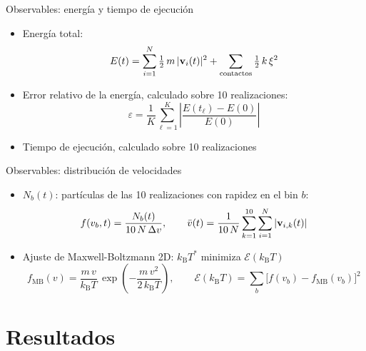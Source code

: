 \documentclass[aspectratio=169]{beamer}
\newcommand{\kT}{k_{\mathrm{B}}T}
\begin{document}
\begin{frame}{Observables: energía y tiempo de ejecución}
  \begin{itemize}\setlength{\itemsep}{0.8em}
    \item Energía total:
      \[
        E(t) = \sum_{i=1}^{N} \tfrac{1}{2}\,m\,|\mathbf{v}_i(t)|^2
          + \sum_{\text{contactos}} \tfrac{1}{2}\,k\,\xi^2
      \]
    \item Error relativo de la energía, calculado sobre 10 realizaciones:
      \[
        \varepsilon = \frac{1}{K}\sum_{\ell=1}^{K} \left|\frac{E(t_\ell) - E(0)}{E(0)}\right|
      \]
    \item Tiempo de ejecución, calculado sobre 10 realizaciones
  \end{itemize}
\end{frame}

\begin{frame}{Observables: distribución de velocidades}
  \begin{itemize}\setlength{\itemsep}{0.6em}
    \item $N_b(t)$: partículas de las 10 realizaciones con rapidez en el bin $b$:
      \[
        f(v_b, t) = \frac{N_b(t)}{10\,N\,\Delta v}, \qquad
        \bar{v}(t) = \frac{1}{10\,N}\sum_{k=1}^{10}\sum_{i=1}^{N} |\mathbf{v}_{i,k}(t)|
      \]
    \item Ajuste de Maxwell-Boltzmann 2D: $\kT^{*}$ minimiza $\mathcal{E}(\kT)$
      \[
        f_{\mathrm{MB}}(v) = \frac{m\,v}{\kT}\,\exp\!\left(-\frac{m\,v^2}{2\,\kT}\right), \qquad
        \mathcal{E}(\kT) = \sum_b \bigl[f(v_b) - f_{\mathrm{MB}}(v_b)\bigr]^2
      \]
  \end{itemize}
\end{frame}

\section{Resultados}
\end{document}
